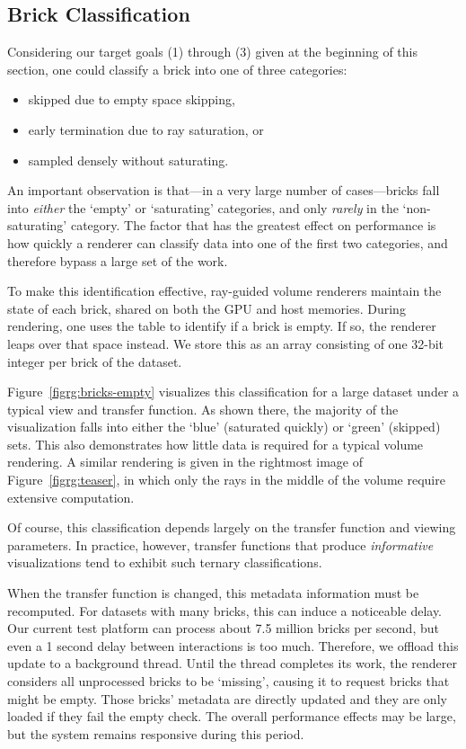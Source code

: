 \subsection{Brick Classification}
\label{sec:brick-classification}

Considering our target goals (1) through (3) given at the beginning of
this section, one could classify a brick into one of three categories:
\begin{itemize}
  \itemsep0em
  \item skipped due to empty space skipping,

  \item early termination due to ray saturation, or

  \item sampled densely without saturating.
\end{itemize}

An important observation is that---in a very large number of
cases---bricks fall into \emph{either} the `empty' or `saturating'
categories, and only \emph{rarely} in the `non-saturating' category.
The factor that has the greatest effect on performance is how quickly
a renderer can classify data into one of the first two categories, and
therefore bypass a large set of the work.

To make this identification effective, ray-guided volume renderers
maintain the state of each brick, shared on both the GPU and host
memories.  During rendering, one uses the table to identify if a brick
is empty.  If so, the renderer leaps over that space instead.  We store
this as an array consisting of one 32-bit integer per brick of the
dataset.

Figure~\ref{figrg:bricks-empty} visualizes this classification for a
large dataset under a typical view and transfer function.  As shown
there, the majority of the visualization falls into either the `blue'
(saturated quickly) or `green' (skipped) sets. This also demonstrates
how little data is required for a typical volume rendering.  A similar
rendering is given in the rightmost image of
Figure~\ref{figrg:teaser}, in which only the rays in the middle of the
volume require extensive computation.

Of course, this classification depends largely on the transfer function
and viewing parameters.  In practice, however, transfer functions that
produce \emph{informative} visualizations tend to exhibit such ternary
classifications.

When the transfer function is changed, this metadata information
must be recomputed.  For datasets with many bricks, this can induce
a noticeable delay.  Our current test platform can process about
7.5 million bricks per second, but even a 1 second delay between
interactions is too much.  Therefore, we offload this update to a
background thread.  Until the thread completes its work, the renderer
considers all unprocessed bricks to be `missing', causing it to request
bricks that might be empty.  Those bricks' metadata are directly
updated and they are only loaded if they fail the empty check.  The
overall performance effects may be large, but the system remains
responsive during this period.

